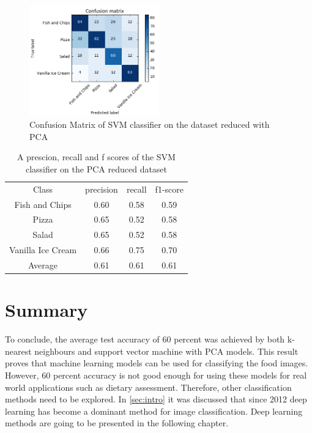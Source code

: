 \begin{figure}[h]
\centering
\includegraphics[width=0.5\textwidth]{Figures/conf_svm_pca.PNG}
\caption{Confusion Matrix of SVM classifier on the dataset reduced with PCA}
\label{fig:conf_svm_pca}
\end{figure}

\begin{table}[h!]
\begin{center}
\begin{tabular}{ |c|c|c|c| } 
 \hline
 Class & precision &   recall & f1-score  \\ 
 Fish and Chips    &   0.60    &  0.58    &  0.59 \\
            Pizza   &    0.65   &   0.52   &   0.58 \\
            Salad    &   0.65    &  0.52   &   0.58  \\
Vanilla Ice Cream     &   0.66    &  0.75   &   0.70   \\ \hline
     Average     &  0.61   &   0.61   &   0.61       \\
 \hline
\end{tabular}
\caption{A prescion, recall and f scores of the SVM classifier on the PCA reduced dataset}
\label{table:pca}
\end{center}
\end{table}

\section{Summary}

To conclude, the average test accuracy of 60 percent was achieved by both k-nearest neighbours and support vector machine with PCA models. This result proves that machine learning models can be used for classifying the food images. However, 60 percent accuracy is not good enough for using these models for real world applications such as dietary assessment. Therefore, other classification methods need to be explored. In \autoref{sec:intro} it was discussed that since 2012 deep learning has become a dominant method for image classification.  Deep learning methods are going to be presented in the following chapter.